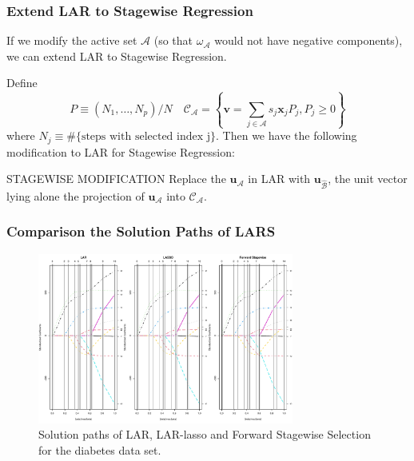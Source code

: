 \begin{frame}
\frametitle{Extend LAR to Stagewise Regression}
If we modify the active set $\mathcal{A}$ (so that $\omega_\mathcal{A}$ would not have negative components), we can extend LAR to Stagewise Regression.

Define
$$P\equiv(N_1,\dots,N_p)/N \quad \mathcal{C}_{\mathcal{A}}=\left\{\mathbf{v}=\sum_{j\in\mathcal{A}}s_j \mathbf{x}_j P_j, P_j\geq 0\right\}$$ 
where $N_j\equiv \#\{\text{steps with selected index j}\}$. Then we have the following modification to LAR for Stagewise Regression:

\begin{block}{STAGEWISE MODIFICATION}
Replace the $\mathbf{u}_{\mathcal{A}}$ in LAR with $\mathbf{u}_{\hat{\mathcal{B}}}$, the unit vector lying alone the projection of $\mathbf{u}_{\mathcal{A}}$ into $\mathcal{C}_{\mathcal{A}}$.
\end{block}
\end{frame}

\begin{frame}
    \frametitle{Comparison the Solution Paths of LARS}
\begin{figure}[!htbp]
    \begin{center}
        \includegraphics[width=0.75\textwidth]{img/lars_diabetes.pdf}
    \end{center}
    \caption{Solution paths of LAR, LAR-lasso and Forward Stagewise Selection for the diabetes data set.}\label{fig:lars_diabetes}
\end{figure}
\end{frame}

